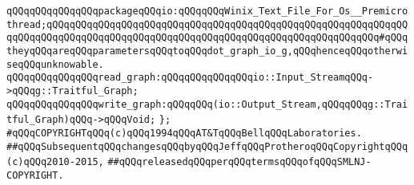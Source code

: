 \verb|qQQqqQQqqQQqqQQqpackageqQQqio:qQQqqQQqWinix_Text_File_For_Os__Premicrothread;qQQqqQQqqQQqqQQqqQQqqQQqqQQqqQQqqQQqqQQqqQQqqQQqqQQqqQQqqQQqqQQqqQQqqQQqqQQqqQQqqQQqqQQqqQQqqQQqqQQqqQQqqQQqqQQqqQQqqQQqqQQqqQQq#qQQqtheyqQQqareqQQqparametersqQQqtoqQQqdot_graph_io_g,qQQqhenceqQQqotherwiseqQQqunknowable.|\newline
\newline
\verb|qQQqqQQqqQQqqQQqread_graph:qQQqqQQqqQQqqQQqio::Input_StreamqQQq->qQQqg::Traitful_Graph;|\newline
\verb|qQQqqQQqqQQqqQQqwrite_graph:qQQqqQQq(io::Output_Stream,qQQqqQQqg::Traitful_Graph)qQQq->qQQqVoid;|\newline
\verb|};|\newline
\newline
\newline
\verb|#qQQqCOPYRIGHTqQQq(c)qQQq1994qQQqAT&TqQQqBellqQQqLaboratories.|\newline
\verb|##qQQqSubsequentqQQqchangesqQQqbyqQQqJeffqQQqProtheroqQQqCopyrightqQQq(c)qQQq2010-2015,|\newline
\verb|##qQQqreleasedqQQqperqQQqtermsqQQqofqQQqSMLNJ-COPYRIGHT.|\newline


